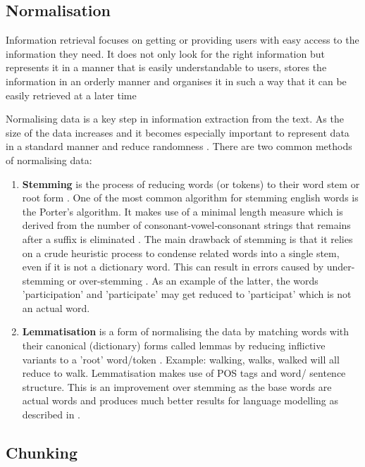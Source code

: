 \subsection{Normalisation} \label{normalisation}

Information retrieval focuses on getting or
providing users with easy access to the information they need.
It does not only look for the right information but represents
it in a manner that is easily understandable to users, stores the
information in an orderly manner and organises it in such a
way that it can be easily retrieved at a later time

Normalising data is a key step in information extraction from the text. As the size of the data increases and it becomes especially important to represent data in a standard manner and reduce randomness \cite{stemming}. There are two common methods of normalising data: 

\begin{enumerate}
    \item \textbf{Stemming} is the process of reducing words (or tokens) to their word stem or root form \cite{stemming}. One of the most common algorithm for stemming english words is the Porter's algorithm. It makes use of a minimal length measure which is derived from the number of consonant‐vowel‐consonant strings that remains after a suffix is eliminated \cite{porter}. The main drawback of stemming is that it relies on a crude heuristic process to condense related words into a single stem, even if it is not a dictionary word. This can result in errors caused by under-stemming or over-stemming \cite{medium_stemming}. As an example of the latter, the words 'participation' and 'participate' may get reduced to 'participat' which is not an actual word. 
    
    \item \textbf{Lemmatisation} is a form of normalising the data by matching words with their canonical (dictionary) forms called lemmas by reducing inflictive variants to a 'root' word/token \cite{stemming}. Example: walking, walks, walked will all reduce to walk. Lemmatisation makes use of POS tags and word/ sentence structure. This is an improvement over stemming as the base words are actual words and produces much better results for language modelling as described in \cite{stemming}. 
    
\end{enumerate}

\subsection{Chunking}


